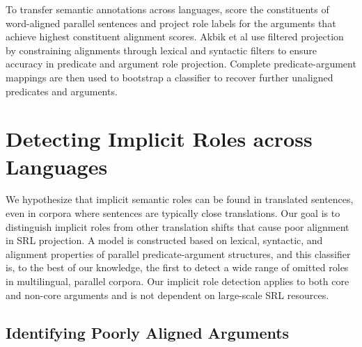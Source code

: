 \documentclass[11pt]{article}
\begin{document}
To transfer semantic annotations across languages,  score the constituents of word-aligned parallel sentences and project role labels for the arguments that achieve highest constituent alignment scores. Akbik et al  use filtered projection by constraining alignments through lexical and syntactic filters to ensure accuracy in predicate and argument role projection. Complete predicate-argument mappings are then used to bootstrap a classifier to recover further unaligned predicates and arguments.
%

\section{Detecting Implicit Roles across Languages}
We hypothesize that implicit semantic roles can be found in translated sentences, even in corpora where sentences are typically close translations. Our goal is to distinguish implicit roles from other translation shifts that cause poor alignment in SRL projection. A model is constructed based on lexical, syntactic,  and alignment properties of parallel predicate-argument structures, and this classifier is, to the best of our knowledge, the first to detect a wide range of omitted roles in multilingual, parallel corpora. Our implicit role detection applies to both core and non-core arguments and is not dependent on large-scale SRL resources.

\subsection{Identifying Poorly Aligned Arguments}
\end{document}
